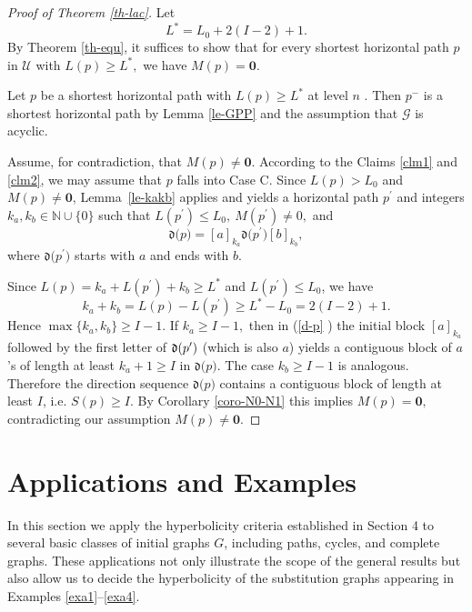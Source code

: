 \documentclass[reqno]{amsart}
\theoremstyle{plain}
\numberwithin{equation}{section}
\begin{document}
\begin{proof}[Proof of Theorem \protect\ref{th-lac}]
Let 
\begin{equation*}
L^{\ast }=L_{0}+2(I-2)+1.
\end{equation*}%
By Theorem \ref{th-equ}, it suffices to show that for every shortest
horizontal path $p$ in $\mathcal{U}$ with $L(p)\geq L^{\ast },$ we have $%
M(p)=\boldsymbol{0}$.

Let $p$ be a shortest horizontal path with $L(p)\geq L^{\ast }$ at level $n$%
. Then $p^{-}$ is a shortest horizontal path by Lemma \ref{le-GPP} and the
assumption that $\mathcal{G}$ is acyclic.

Assume, for contradiction, that $M(p)\neq \boldsymbol{0}$. According to the
Claims \ref{clm1} and \ref{clm2}, we may assume that $p$ falls into Case C.
Since $L(p)>L_{0}$ and $M(p)\neq \mathbf{0}$, Lemma~\ref{le-kakb} applies
and yields a horizontal path $p^{\prime }$ and integers $k_{a},k_{b}\in 
\mathbb{N}\cup \{0\}$ such that $L(p^{\prime })\leq L_{0},\ M(p^{\prime
})\neq 0,$ and 
\begin{equation}
\mathfrak{d(}p)=[a]_{k_{a}}\mathfrak{d(}p^{\prime })[b]_{k_{b}},  \label{d-p}
\end{equation}%
where $\mathfrak{d(}p^{\prime })$ starts with $a$ and ends with $b$.

Since $L(p)=k_{a}+L(p^{\prime })+k_{b}\geq L^{\ast }$ and $L(p^{\prime
})\leq L_{0}$, we have 
\begin{equation*}
k_{a}+k_{b}=L(p)-L(p^{\prime })\geq L^{\ast }-L_{0}=2(I-2)+1.
\end{equation*}%
Hence $\max \{k_{a},k_{b}\}\geq I-1$. If $k_{a}\geq I-1,$ then in (\ref{d-p}%
) the initial block $[a]_{k_{a}}$ followed by the first letter of $\mathfrak{%
d(}p^{\prime })$ (which is also $a$) yields a contiguous block of $a$'s of
length at least $k_{a}+1\geq I$ in $\mathfrak{d(}p)$. The case $k_{b}\geq
I-1 $ is analogous. Therefore the direction sequence $\mathfrak{d(}p)$
contains a contiguous block of length at least $I$, i.e. $S(p)\geq I.$ By
Corollary \ref{coro-N0-N1} this implies $M(p)=\boldsymbol{0},$ contradicting
our assumption $M(p)\neq \boldsymbol{0}$.
\end{proof}

\bigskip

\section{Applications and Examples}

In this section we apply the hyperbolicity criteria established in Section 4
to several basic classes of initial graphs $G$, including paths, cycles, and
complete graphs. These applications not only illustrate the scope of the
general results but also allow us to decide the hyperbolicity of the
substitution graphs appearing in Examples \ref{exa1}--\ref{exa4}.
\end{document}

